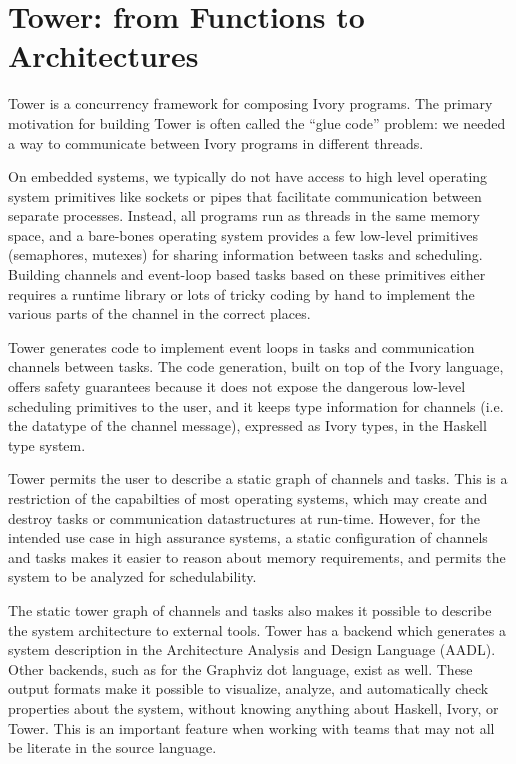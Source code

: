 \section{Tower: from Functions to Architectures}

Tower is a concurrency framework for composing Ivory programs. The primary
motivation for building Tower is often called the ``glue code'' problem: we
needed a way to communicate between Ivory programs in different threads.

On embedded systems, we typically do not have access to high level operating
system primitives like sockets or pipes that facilitate communication between
separate processes. Instead, all programs run as threads in the same memory
space, and a bare-bones operating system provides a few low-level primitives
(semaphores, mutexes) for sharing information between tasks and scheduling.
Building channels and event-loop based tasks based on these primitives either
requires a runtime library or lots of tricky coding by hand to implement the
various parts of the channel in the correct places.

Tower generates code to implement event loops in tasks and communication
channels between tasks. The code generation, built on top of the Ivory language,
offers safety guarantees because it does not expose the dangerous low-level
scheduling primitives to the user, and it keeps type information for channels
(i.e. the datatype of the channel message), expressed as Ivory types, in the
Haskell type system.

Tower permits the user to describe a static graph of channels and tasks. This is
a restriction of the capabilties of most operating systems, which may create and
destroy tasks or communication datastructures at run-time. However, for the
intended use case in high assurance systems, a static configuration of channels
and tasks makes it easier to reason about memory requirements, and permits
the system to be analyzed for schedulability.

The static tower graph of channels and tasks also makes it possible to
describe the system architecture to external tools. Tower has a backend which
generates a system description in the Architecture Analysis and Design Language
(AADL). Other backends, such as for the Graphviz dot language, exist as well.
These output formats make it possible to visualize, analyze, and automatically
check properties about the system, without knowing anything about Haskell,
Ivory, or Tower. This is an important feature when working with teams that may
not all be literate in the source language.

